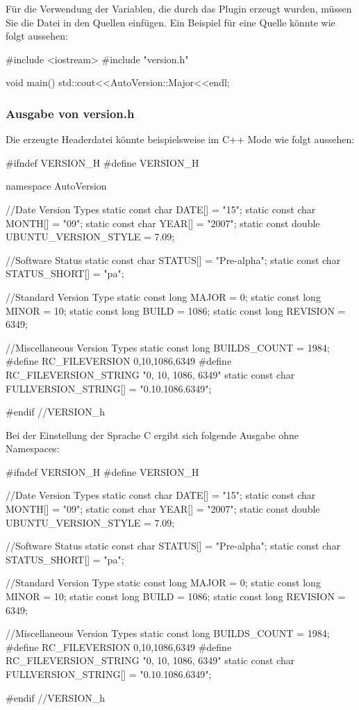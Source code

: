 Für die Verwendung der Variablen, die durch das Plugin erzeugt wurden, müssen Sie die Datei  in den Quellen einfügen. Ein Beispiel für eine Quelle könnte wie folgt aussehen:

\begin{code}
#include <iostream>
#include "version.h"

void main(){
    std::cout<<AutoVersion::Major<<endl;
}
\end{code}

\subsubsection{Ausgabe von version.h}

Die erzeugte Headerdatei könnte beispielsweise im C++ Mode wie folgt aussehen:

\begin{code}
#ifndef VERSION_H
#define VERSION_H

namespace AutoVersion{

	//Date Version Types
	static const char DATE[] = "15";
	static const char MONTH[] = "09";
	static const char YEAR[] = "2007";
	static const double UBUNTU_VERSION_STYLE = 7.09;

	//Software Status
	static const char STATUS[] = "Pre-alpha";
	static const char STATUS_SHORT[] = "pa";

	//Standard Version Type
	static const long MAJOR = 0;
	static const long MINOR = 10;
	static const long BUILD = 1086;
	static const long REVISION = 6349;

	//Miscellaneous Version Types
	static const long BUILDS_COUNT = 1984;
	#define RC_FILEVERSION 0,10,1086,6349
	#define RC_FILEVERSION_STRING "0, 10, 1086, 6349\0"
	static const char FULLVERSION_STRING[] = "0.10.1086.6349";

}
#endif //VERSION_h
\end{code}

Bei der Einstellung der Sprache C ergibt sich folgende Ausgabe ohne Namespaces:

\begin{code}
#ifndef VERSION_H
#define VERSION_H

	//Date Version Types
	static const char DATE[] = "15";
	static const char MONTH[] = "09";
	static const char YEAR[] = "2007";
	static const double UBUNTU_VERSION_STYLE = 7.09;

	//Software Status
	static const char STATUS[] = "Pre-alpha";
	static const char STATUS_SHORT[] = "pa";

	//Standard Version Type
	static const long MAJOR = 0;
	static const long MINOR = 10;
	static const long BUILD = 1086;
	static const long REVISION = 6349;

	//Miscellaneous Version Types
	static const long BUILDS_COUNT = 1984;
	#define RC_FILEVERSION 0,10,1086,6349
	#define RC_FILEVERSION_STRING "0, 10, 1086, 6349\0"
	static const char FULLVERSION_STRING[] = "0.10.1086.6349";

#endif //VERSION_h
\end{code}

